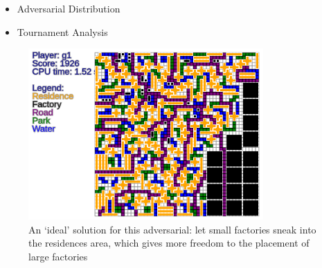\documentclass{beamer}
\begin{document}
\begin{frame}
  \begin{itemize}
      \item Adversarial Distribution
      \item Tournament Analysis
  \end{itemize}
\end{frame}

\begin{frame}
  \begin{figure}[ht]
\centering
\includegraphics[width=0.8\textwidth]{IdealSolutionForAdversarial.png}
\caption{An `ideal' solution for this adversarial: let small factories
sneak into the residences area, which gives more freedom to the placement
of large factories}
\end{figure}

\end{frame}
\end{document}
